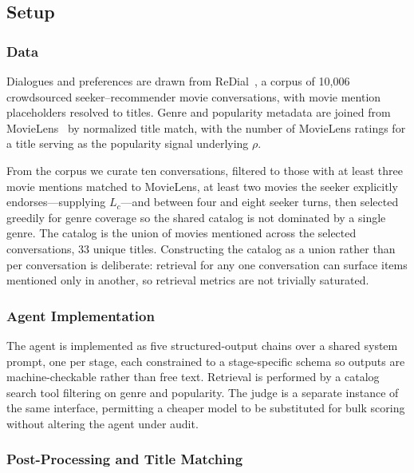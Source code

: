 \documentclass[manuscript,screen,review]{acmart}
\begin{document}
\subsection{Setup}
\label{sec:framework-setup}

\subsubsection{Data}
\label{sec:data}

Dialogues and preferences are drawn from ReDial~\cite{li2018redial}, a corpus of
10{,}006 crowdsourced seeker--recommender movie conversations, with movie mention
placeholders resolved to titles. Genre and popularity metadata are joined from
MovieLens~\cite{harper2015movielens} by normalized title match, with the number of
MovieLens ratings for a title serving as the popularity signal underlying $\rho$.

From the corpus we curate ten conversations, filtered to those with at least three
movie mentions matched to MovieLens, at least two movies the seeker explicitly
endorses---supplying $L_c$---and between four and eight seeker turns, then selected
greedily for genre coverage so the shared catalog is not dominated by a single
genre. The catalog is the union of movies mentioned across the selected
conversations, $33$ unique titles. Constructing the catalog as a union rather than
per conversation is deliberate: retrieval for any one conversation can surface
items mentioned only in another, so retrieval metrics are not trivially saturated.

\subsubsection{Agent Implementation}
\label{sec:agent}

The agent is implemented as five structured-output chains over a shared system
prompt, one per stage, each constrained to a stage-specific schema so outputs are
machine-checkable rather than free text. Retrieval is performed by a catalog
search tool filtering on genre and popularity. The judge is a separate instance of
the same interface, permitting a cheaper model to be substituted for bulk scoring
without altering the agent under audit.

\subsubsection{Post-Processing and Title Matching}
\label{sec:postproc}
\end{document}
